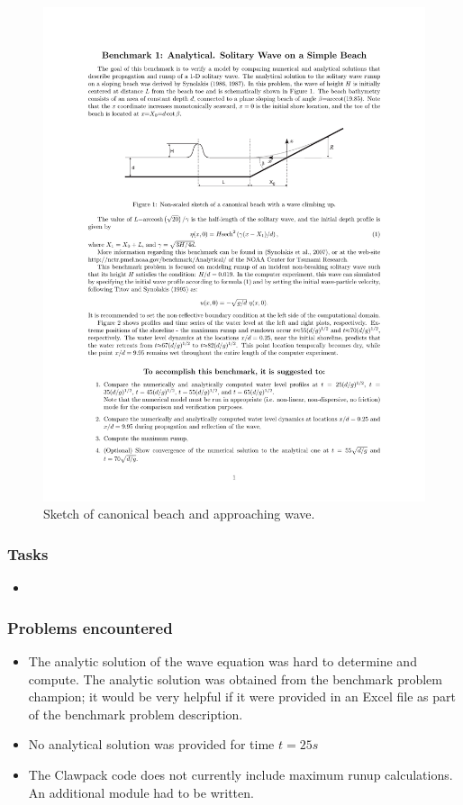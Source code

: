 \begin{figure}[ht]
\hfil\includegraphics[width=5.0in]{bp1/bp1domain}\hfil
\caption{\label{fig:bp1domain} 
Sketch of canonical beach and approaching wave.
 }
\end{figure}

\subsubsection{Tasks}
\begin{itemize}
\item{}
\end{itemize}

\subsubsection{Problems encountered}

\begin{itemize}
\item The analytic solution of the wave equation was hard to determine and compute.  The analytic solution was obtained from the benchmark problem champion; it would be very helpful if it were provided in an Excel file as part of the benchmark problem description.  
\item No analytical solution was provided for time $t = 25s$
\item The Clawpack code does not currently include maximum runup calculations. An additional module had to be written. 
\end{itemize}

